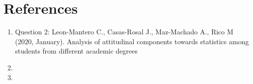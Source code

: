 \documentclass[
	letterpaper, %
]{jdf}
\begin{document}
\section{References}

\printbibliography[heading=none]
\begin{enumerate}
    \item Question 2: \hfill \break
    Leon-Mantero C., Casas-Rosal J., Maz-Machado A., Rico M (2020, January). Analysis of attitudinal components towards statistics among students from different academic degrees
    \item 
    \item 

\end{enumerate}
\end{document}
